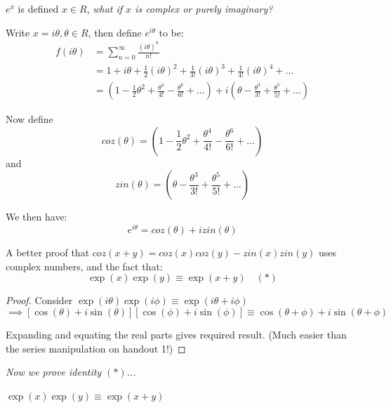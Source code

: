 \documentclass[10pt]{scrartcl}
\begin{document}
$e^x$ is defined $x \in R$, \emph{ what if $x$ is complex or purely imaginary?}\\

\begin{definition}
Write $x = i\theta, \theta \in R$, then define $e^{i\theta}$ to be:
\[\begin{aligned}f(i \theta) &= \sum_{n=0}^{\infty} \frac{(i\theta)^n}{n!}\\
&= 1 + i\theta + \frac{1}{2}(i\theta)^2 + \frac{1}{3!}(i\theta)^3 + \frac{1}{4!}(i\theta)^4 + \dots\\
& = \left(1 - \frac{1}{2}\theta^2 + \frac{\theta^4}{4!} - \frac{\theta^6}{6!} + \dots\right) + i\left(\theta - \frac{\theta^3}{3!} + \frac{\theta^5}{5!} + \dots\right)\end{aligned}\]\vspace*{5pt}

Now define \[coz(\theta) = \left(1 - \frac{1}{2}\theta^2 + \frac{\theta^4}{4!} - \frac{\theta^6}{6!} + \dots\right)  \] and \[zin(\theta) = \left(\theta - \frac{\theta^3}{3!} + \frac{\theta^5}{5!} + \dots\right)\]

We then have: \[\boxed{e^{i\theta} = coz(\theta) + izin(\theta)}\]
\end{definition}


A 
better proof that $coz(x+y) = coz(x)coz(y) - zin(x)zin(y)$ uses complex numbers, and the fact that:
\[\boxed{\exp(x)\exp(y) \equiv \exp(x+y) \quad (*)}\]

\begin{proof}
Consider $\exp(i\theta)\exp(i\phi) \equiv \exp(i\theta + i\phi)$ 
\[\implies [\cos(\theta)+ i\sin(\theta)][\cos(\phi) + i\sin(\phi)] \equiv \cos(\theta + \phi) + i \sin(\theta + \phi)\]

Expanding and equating the real parts gives required result. (Much easier than the series manipulation on handout 1!)
\end{proof}

\emph{Now we prove identity $(*)$...}

\begin{proposition}
$\exp(x)\exp(y) \equiv \exp(x+y)$
\end{proposition}
\end{document}
